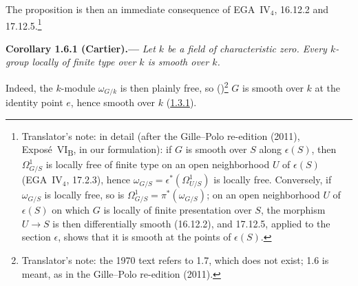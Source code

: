 The proposition is then an immediate consequence of
EGA~IV\(_4\), 16.12.2 and 17.12.5.\footnote{Translator's note: in detail (after the Gille--Polo
re-edition (2011), Expos\'e~VI\textsubscript{B}, in our formulation): if \(G\) is smooth over \(S\) along
\(\epsilon(S)\), then \(\Omega^1_{G/S}\) is locally free of finite type on an open neighborhood \(U\) of
\(\epsilon(S)\) (EGA~IV\(_4\), 17.2.3), hence \(\omega_{G/S}=\epsilon^*(\Omega^1_{U/S})\) is locally free.
Conversely, if \(\omega_{G/S}\) is locally free, so is \(\Omega^1_{G/S}=\pi^*(\omega_{G/S})\); on an open
neighborhood \(U\) of \(\epsilon(S)\) on which \(G\) is locally of finite presentation over \(S\), the
morphism \(U\to S\) is then differentially smooth (16.12.2), and 17.12.5, applied to the section
\(\epsilon\), shows that it is smooth at the points of \(\epsilon(S)\).}

\medskip
{}\label{cor:sga3-VIB-1.6.1}%
\noindent\textbf{Corollary 1.6.1 (Cartier).---}
\emph{Let \(k\) be a field of characteristic zero. Every
\(k\)-group locally of finite type over \(k\) is smooth over
\(k\).}

Indeed, the \(k\)-module \(\omega_{G/k}\) is then plainly free, so
()\footnote{Translator's note: the 1970 text refers to 1.7, which does not
exist; 1.6 is meant, as in the Gille--Polo re-edition (2011).} \(G\) is smooth over \(k\) at the
identity point \(e\), hence smooth over \(k\) (\hyperref[cor:sga3-VIB-1.3.1]{1.3.1}).
